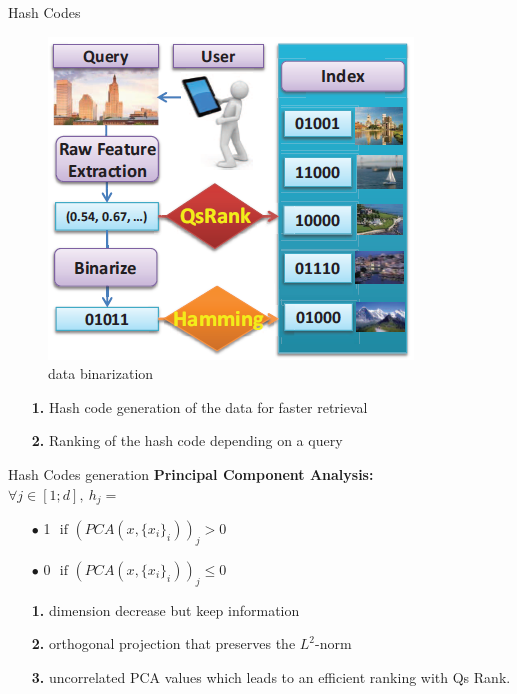 \documentclass[english]{beamer}
\theoremstyle{plain}
\theoremstyle{remark}
\begin{document}
\begin{frame}{Hash Codes}

\begin{figure}[htbp]
	\begin{center}
	\includegraphics[width=.5\linewidth]{Images/intro2.png}
	\caption{data binarization}
	\end{center}
	\label{fig:intro2}
\end{figure}
\begin{itemize}
	\item[\textbf{1.}] Hash code generation of the data for faster retrieval
	\item[\textbf{2.}] Ranking of the hash code depending on a query
\end{itemize}

\end{frame}

\begin{frame}{Hash Codes generation}
\textbf{Principal Component Analysis:}\\
\vspace{1em}
$\forall j \in [1;d],\ h_j = $	
\begin{itemize}
    \item[$\bullet$]1 $\text{ if }(PCA(x, \{x_i\}_i))_j > 0$
    \item[$\bullet$]0 $\text{ if }(PCA(x, \{x_i\}_i))_j \leq 0$
\end{itemize}
\pause
\vspace{1em}
\begin{itemize}
	\item[\textbf{1.}]dimension decrease but keep information
	\item[\textbf{2.}]orthogonal projection that preserves the $L^2$-norm
	\item[\textbf{3.}]uncorrelated PCA values which leads to an efficient ranking with Qs Rank.
\end{itemize}
\end{frame}
\end{document}
